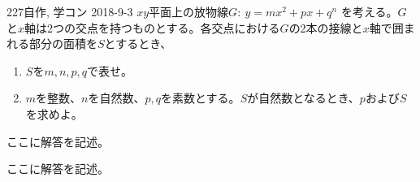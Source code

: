 \begin{thm}{227}{}{自作, 学コン 2018-9-3}
 $xy$平面上の放物線$G:~y=mx^2+px+q^n$ を考える。$G$と$x$軸は2つの交点を持つものとする。各交点における$G$の2本の接線と$x$軸で囲まれる部分の面積を$S$とするとき、
 \begin{enumerate}
  \item $S$を$m, n, p, q$で表せ。
  \item $m$を整数、$n$を自然数、$p, q$を素数とする。$S$が自然数となるとき、$p$および$S$を求めよ。
 \end{enumerate}
\end{thm}

ここに解答を記述。

ここに解答を記述。